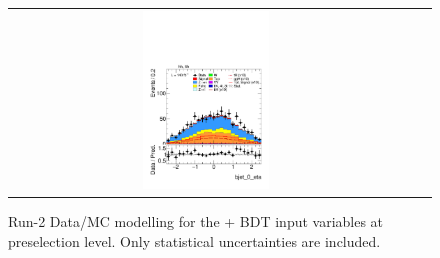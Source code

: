 \begin{figure}[htbp]
\begin{tabular}{@{}c c c@{}}
    \includegraphics[width=0.33\textwidth]{images/plots_modelling_run2_run3_variables/run_2_tth/plot_bjet_0_eta_hh_tth_15_16_17_18.pdf}
  \end{tabular}

  \caption{Run-2 Data/MC modelling for the \thqb + \ttH BDT input variables at preselection level. Only statistical uncertainties are included.}
  \label{tth_vars_modelling_run2_2}
\end{figure}

